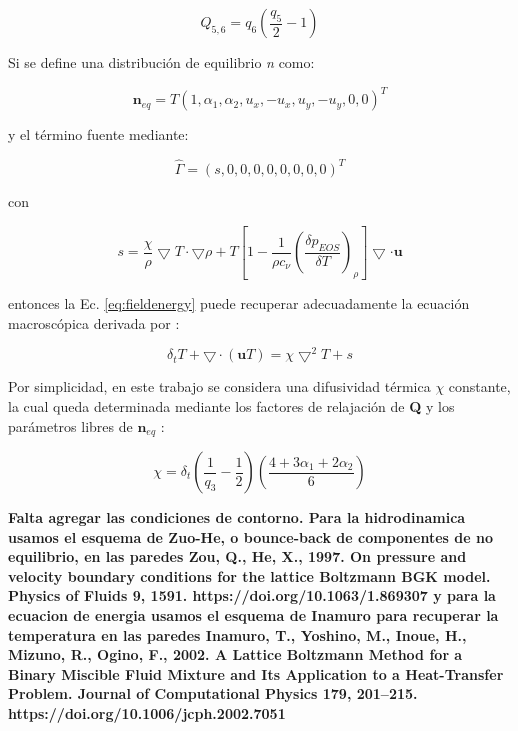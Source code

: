 \begin{equation}
    Q_{5,6} = q_{6} \left( \frac{q_{5}}{2} - 1 \right)
\end{equation}

Si se define una distribución de equilibrio \textit{n} como:

\begin{equation}
    {\mathbf{n}}_{eq} = T { \left( 1, \alpha_{1}, \alpha_{2}, u_{x}, -u_{x}, u_{y}, -u_{y}, 0, 0 \right) }^{T}
\end{equation}

y el término fuente mediante:

\begin{equation}
    \hat{\Gamma} = {( s, 0, 0, 0, 0, 0, 0, 0, 0 )}^{T}
\end{equation}

con 

\begin{equation}
    s = \frac{\chi}{\rho} \bigtriangledown T \cdot \bigtriangledown \rho + T \left[ 1 - \frac{1}{\rho c_{\nu}} {\left( \frac{\delta p_{EOS}}{\delta T} \right)}_{\rho} \right] \bigtriangledown \cdot \mathbf{u}
\end{equation}

entonces la Ec. \ref{eq:fieldenergy} puede recuperar adecuadamente la ecuación macroscópica derivada por \cite{markus2011simulation}:

\begin{equation}
    \delta_{t} T + \bigtriangledown \cdot ( \mathbf{u} T ) = \chi {\bigtriangledown }^{2} T + s
\end{equation}

Por simplicidad, en este trabajo se considera una difusividad térmica $\chi$ constante, la cual queda determinada mediante los factores de relajación de \textbf{Q} y los parámetros libres de ${\textbf{n}}_{eq}$ :

\begin{equation}
    \chi = \delta_{t} \left( \frac{1}{q_{3}} - \frac{1}{2} \right) \left( \frac{ 4 + 3 \alpha_{1} + 2 \alpha_{2}}{6} \right)
\end{equation}


\textbf{Falta agregar las condiciones de contorno. Para la hidrodinamica usamos el esquema de Zuo-He, o bounce-back de componentes de no equilibrio, en las paredes
Zou, Q., He, X., 1997. On pressure and velocity boundary conditions for the lattice Boltzmann BGK model. Physics of Fluids 9, 1591. https://doi.org/10.1063/1.869307
y para la ecuacion de energia usamos el esquema de Inamuro para recuperar la temperatura en las paredes
Inamuro, T., Yoshino, M., Inoue, H., Mizuno, R., Ogino, F., 2002. A Lattice Boltzmann Method for a Binary Miscible Fluid Mixture and Its Application to a Heat-Transfer Problem. Journal of Computational Physics 179, 201–215. https://doi.org/10.1006/jcph.2002.7051}


